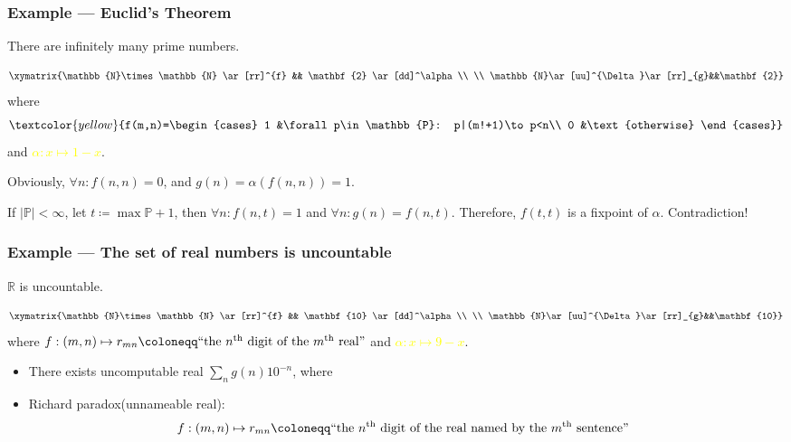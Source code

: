 \documentclass[UTF8,aspectratio=43,11pt,colorlinks,compress,openany]{beamer}%
\begin{document}
\begin{frame}\frametitle{Example --- Euclid's Theorem}\vspace{-1ex}
	\begin{theorem}
		There are infinitely many prime numbers.
	\end{theorem}\vspace{-2ex}
	\[\xymatrix{\mathbb{N}\times \mathbb{N}
		\ar[rr]^{f} && \mathbf{2} \ar[dd]^\alpha
		\\
		\\
		\mathbb{N}\ar[uu]^{\Delta}\ar[rr]_{g}&&\mathbf{2}}\]
	where 
	\[\textcolor{yellow}{f(m,n)=\begin{cases}
	1 &\forall p\in\mathbb{P}: p|(m!+1)\to p<n\\
	0 &\text{otherwise}
	\end{cases}}\]
	and \textcolor{yellow}{$\alpha: x\mapsto 1-x$}.
	
	Obviously, $\forall n: f(n,n)=0$, and $g(n)=\alpha(f(n,n))=1$.
	
	If $|\mathbb{P}|<\infty$, let $t\coloneqq \max\mathbb{P}+1$, then $\forall n: f(n,t)=1$ and $\forall n: g(n)=f(n,t)$. Therefore, $f(t,t)$ is a fixpoint of $\alpha$. Contradiction!
\end{frame}

\begin{frame}\frametitle{Example --- The set of real numbers is uncountable}
	\vspace{-7pt}
	\begin{theorem}[Cantor]
		$\mathbb{R}$ is uncountable.
	\end{theorem}
	\vspace{-7pt}
\setlength\abovedisplayskip{0pt}
\setlength\belowdisplayskip{0pt}
	\[\xymatrix{\mathbb{N}\times \mathbb{N}
		\ar[rr]^{f} && \mathbf{10} \ar[dd]^\alpha
		\\
		\\
		\mathbb{N}\ar[uu]^{\Delta}\ar[rr]_{g}&&\mathbf{10}}\]
	where \textcolor{yellow}{$f: (m,n)\mapsto r_{mn}\coloneqq \mbox{``the $n\textsuperscript{th}$ digit of the $m\textsuperscript{th}$ real''}$} and \textcolor{yellow}{$\alpha: x\mapsto 9-x$}.
	\begin{itemize}
		\item There exists uncomputable real $\sum_ng(n)10^{-n}$, where
		\item Richard paradox(unnameable real):
		\[\!\!\!\!f: (m,n)\mapsto r_{mn}\coloneqq \text{``the $n\textsuperscript{th}$ digit of the real named by the $m\textsuperscript{th}$ sentence''}\]
	\end{itemize}
\end{frame}
\end{document}
